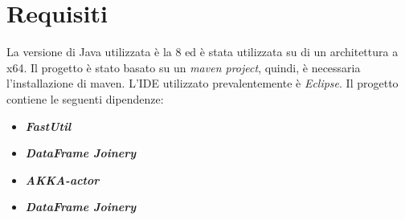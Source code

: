 \section{Requisiti}
La versione di Java utilizzata è la 8 ed è stata utilizzata su di un architettura a x64. Il progetto è stato basato su un \emph{maven project}, quindi, è necessaria l'installazione di maven.
L'IDE utilizzato prevalentemente è \emph{Eclipse}.
Il progetto contiene le seguenti dipendenze:
\begin{itemize}
	\item \textbf{\emph{FastUtil}}
	\item \textbf{\emph{DataFrame Joinery}}
	\item \textbf{\emph{AKKA-actor}}
	\item \textbf{\emph{DataFrame Joinery}}
\end{itemize}